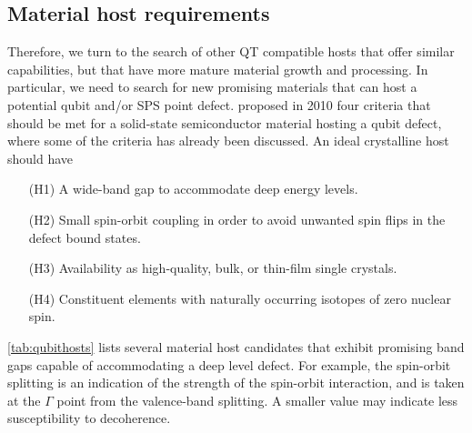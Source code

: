 \subsection{Material host requirements}
\label{ssec:qubit-material-host-requirements}
Therefore, we turn to the search of other QT compatible hosts that offer similar capabilities, but that have more mature material growth and processing. In particular, we need to search for new promising materials that can host a potential qubit and/or SPS point defect. \citeauthor{Weber2010} \cite{Weber2010} proposed in 2010 four criteria that should be met for a solid-state semiconductor material hosting a qubit defect, where some of the criteria has already been discussed. An ideal crystalline host should have \cite{Weber2010}
\begin{itemize}
  \item[(H1)] A wide-band gap to accommodate deep energy levels.
  \item[(H2)] Small spin-orbit coupling in order to avoid unwanted spin flips in the defect bound states.
  \item[(H3)] Availability as high-quality, bulk, or thin-film single crystals.
  \item[(H4)] Constituent elements with naturally occurring isotopes of zero nuclear spin.
\end{itemize}


\noindent \autoref{tab:qubithosts} lists several material host candidates that exhibit promising band gaps capable of accommodating a deep level defect. For example, the spin-orbit splitting is an indication of the strength of the spin-orbit interaction, and is taken at the $\Gamma$ point from the valence-band splitting. A smaller value may indicate less susceptibility to decoherence.

